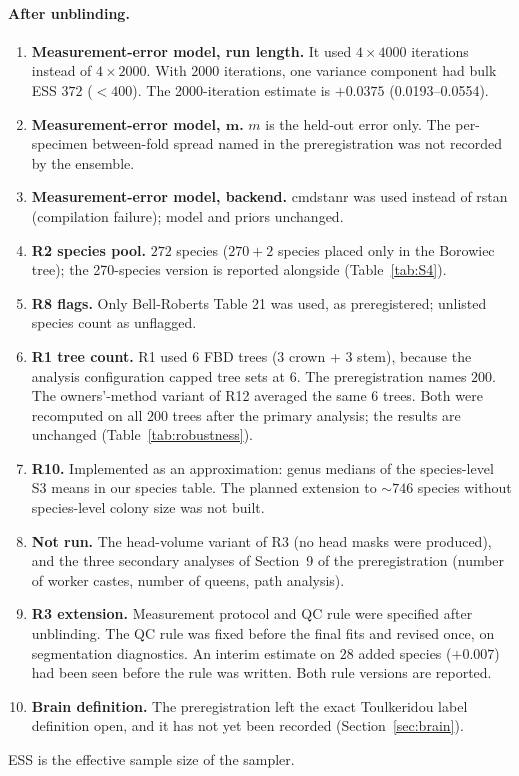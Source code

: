 \paragraph{After unblinding.}
\begin{enumerate}[resume=deviations]
\item\label{dev:melength} \textbf{Measurement-error model, run length.} It used $4 \times 4000$ iterations instead of
$4 \times 2000$. With $2000$ iterations, one variance component had bulk ESS $372$ ($< 400$). The 2000-iteration
estimate is $+0.0375$ (0.0193--0.0554).
\item\label{dev:mem} \textbf{Measurement-error model, $\boldsymbol{m}$.} $m$ is the held-out error only. The
per-specimen between-fold spread named in the preregistration was not recorded by the ensemble.
\item\label{dev:backend} \textbf{Measurement-error model, backend.} cmdstanr was used instead of rstan (compilation
failure); model and priors unchanged.
\item\label{dev:r2pool} \textbf{R2 species pool.} $272$ species ($270 + 2$ species placed only in the Borowiec tree);
the 270-species version is reported alongside (Table~\ref{tab:S4}).
\item\label{dev:r8} \textbf{R8 flags.} Only Bell-Roberts Table 21 was used, as preregistered; unlisted species count as
unflagged.
\item\label{dev:r1} \textbf{R1 tree count.} R1 used $6$ FBD trees ($3$ crown + $3$ stem), because the analysis
configuration capped tree sets at $6$. The preregistration names $200$. The owners'-method variant of R12 averaged the
same $6$ trees. Both were recomputed on all $200$ trees after the primary analysis; the results are unchanged
(Table~\ref{tab:robustness}).
\item\label{dev:r10} \textbf{R10.} Implemented as an approximation: genus medians of the species-level S3 means in our
species table. The planned extension to ${\sim}746$ species without species-level colony size was not built.
\item\label{dev:notrun} \textbf{Not run.} The head-volume variant of R3 (no head masks were produced), and the three
secondary analyses of Section~9 of the preregistration (number of worker castes, number of queens, path analysis).
\item\label{dev:r3x} \textbf{R3 extension.} Measurement protocol and QC rule were specified after unblinding. The QC
rule was fixed before the final fits and revised once, on segmentation diagnostics. An interim estimate on $28$ added
species ($+0.007$) had been seen before the rule was written. Both rule versions are reported.
\item\label{dev:brain} \textbf{Brain definition.} The preregistration left the exact Toulkeridou label definition
open, and it has not yet been recorded (Section~\ref{sec:brain}).
\end{enumerate}

ESS is the effective sample size of the sampler.
